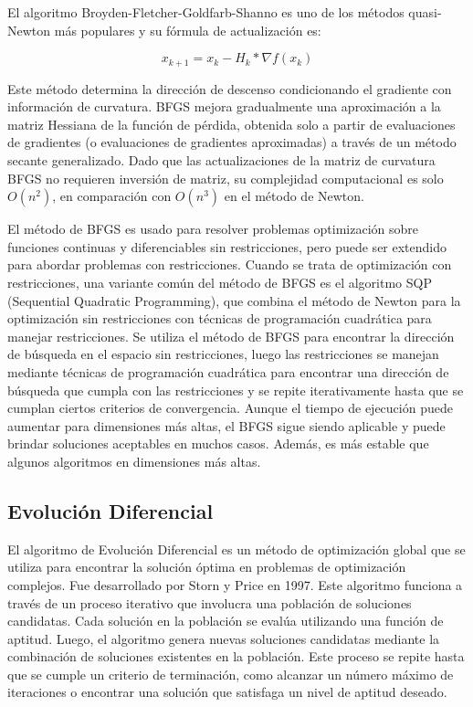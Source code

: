 \documentclass{article}
\begin{document}
El algoritmo Broyden-Fletcher-Goldfarb-Shanno es uno de los métodos
quasi-Newton más populares y su fórmula de actualización es:

$$x_{k+1} = x_{k} - H_{k} * \nabla f(x_{k})$$

Este método determina la dirección de descenso condicionando el
gradiente con información de curvatura. BFGS mejora gradualmente una
aproximación a la matriz Hessiana de la función de pérdida, obtenida
solo a partir de evaluaciones de gradientes (o evaluaciones de
gradientes aproximadas) a través de un método secante generalizado.
Dado que las actualizaciones de la matriz de curvatura BFGS no
requieren inversión de matriz, su complejidad computacional es solo
$O(n^2)$, en comparación con $O(n^3)$ en el método de Newton.

El método de BFGS es usado para resolver problemas optimización sobre
funciones continuas y diferenciables sin
restricciones, pero puede ser extendido para abordar problemas con
restricciones. Cuando se trata de optimización con restricciones, una
variante común del método de BFGS es el algoritmo SQP (Sequential
Quadratic Programming), que combina el método de Newton para la
optimización sin restricciones con técnicas de programación
cuadrática para manejar restricciones. Se utiliza el método de BFGS
para encontrar la dirección de búsqueda en el espacio sin
restricciones, luego las restricciones se manejan mediante técnicas
de programación cuadrática para encontrar una dirección de búsqueda
que cumpla con las restricciones y se repite iterativamente hasta
que se cumplan ciertos criterios de convergencia. Aunque el tiempo de
ejecución puede aumentar para dimensiones más altas, el BFGS sigue
siendo aplicable y puede brindar soluciones aceptables en muchos
casos. Además, es más estable que algunos algoritmos en dimensiones
más altas.

\subsection{Evolución Diferencial}

El algoritmo de Evolución Diferencial es un método de optimización
global que se utiliza para encontrar la solución óptima en problemas
de optimización complejos. Fue desarrollado por Storn y Price en
1997. Este algoritmo funciona a través de un
proceso iterativo que involucra una población de soluciones
candidatas. Cada solución en la población se evalúa utilizando una
función de aptitud. Luego, el algoritmo genera nuevas soluciones
candidatas mediante la combinación de soluciones existentes en la
población. Este proceso se repite hasta que se cumple un criterio de
terminación, como alcanzar un número máximo de iteraciones o
encontrar una solución que satisfaga un nivel de aptitud deseado.
\end{document}
